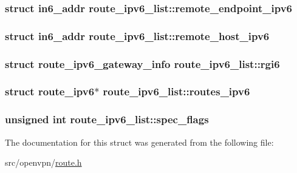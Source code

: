 \subsubsection[{remote\+\_\+endpoint\+\_\+ipv6}]{\setlength{\rightskip}{0pt plus 5cm}struct in6\+\_\+addr route\+\_\+ipv6\+\_\+list\+::remote\+\_\+endpoint\+\_\+ipv6}\label{structroute__ipv6__list_af309b93a54952c1ad1c90a3524500a8a}
\hypertarget{structroute__ipv6__list_aceafdf9eedadcb6120bf3bad2db4cf62}{}
\subsubsection[{remote\+\_\+host\+\_\+ipv6}]{\setlength{\rightskip}{0pt plus 5cm}struct in6\+\_\+addr route\+\_\+ipv6\+\_\+list\+::remote\+\_\+host\+\_\+ipv6}\label{structroute__ipv6__list_aceafdf9eedadcb6120bf3bad2db4cf62}
\hypertarget{structroute__ipv6__list_a35c2e69d66cdd0e1747dde14bfbeafcf}{}
\subsubsection[{rgi6}]{\setlength{\rightskip}{0pt plus 5cm}struct {\bf route\+\_\+ipv6\+\_\+gateway\+\_\+info} route\+\_\+ipv6\+\_\+list\+::rgi6}\label{structroute__ipv6__list_a35c2e69d66cdd0e1747dde14bfbeafcf}
\hypertarget{structroute__ipv6__list_a5675a79731f35a5b035b1231089970b9}{}
\subsubsection[{routes\+\_\+ipv6}]{\setlength{\rightskip}{0pt plus 5cm}struct {\bf route\+\_\+ipv6}$\ast$ route\+\_\+ipv6\+\_\+list\+::routes\+\_\+ipv6}\label{structroute__ipv6__list_a5675a79731f35a5b035b1231089970b9}
\hypertarget{structroute__ipv6__list_aba4d0c00a2776bbf56962b5f91270975}{}
\subsubsection[{spec\+\_\+flags}]{\setlength{\rightskip}{0pt plus 5cm}unsigned int route\+\_\+ipv6\+\_\+list\+::spec\+\_\+flags}\label{structroute__ipv6__list_aba4d0c00a2776bbf56962b5f91270975}


The documentation for this struct was generated from the following file\+:\begin{DoxyCompactItemize}
\item 
src/openvpn/\hyperlink{route_8h}{route.\+h}\end{DoxyCompactItemize}
